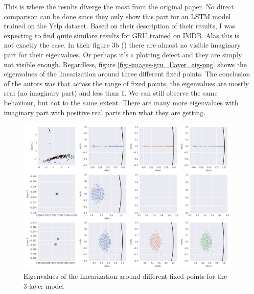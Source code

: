 \documentclass{article}
\begin{document}
This is where the results diverge the most from the original paper. No direct comparison can be done since they only show this part for an LSTM model trained on the Yelp dataset. Based on their description of their results, I was expecting to find quite similare results for GRU trained on IMDB. Alas this is not exactly the case. In their figure 3b (\cite{maheswaranathan2019reverse}) there are almost no visible imaginary part for their eigenvalues. Or perhaps it's a plotting defect and they are simply not visible enough. Regardless, figure \ref{fig:-images-gru_1layer_eig-png} shows the eigenvalues of the linearization around three different fixed points. The conclusion of the autors was that across the range of fixed points, the eigenvalues are mostly real (no imaginary part) and less than 1. We can still observe the same behaviour, but not to the same extent. There are many more eigenvalues with imaginary part with positive real parts then what they are getting.

\begin{figure}[H]
  \centering
  \includegraphics[width=1\textwidth]{../images/gru_3layer_eig.png}
  \caption{Eigenvalues of the linearization around different fixed points for the 3-layer model}
  \label{fig:-images-gru_3layer_eig-png}
\end{figure}
\end{document}

